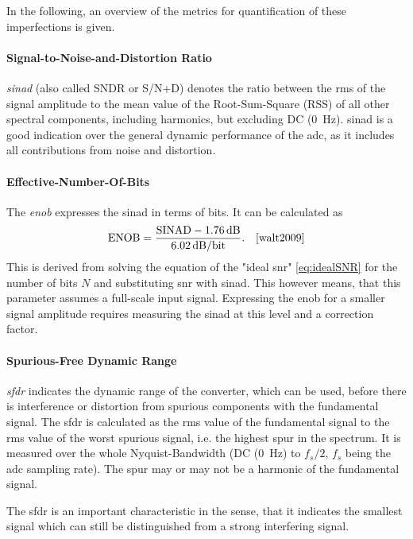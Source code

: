 In the following, an overview of the metrics for quantification of these imperfections is given. 
\paragraph{Signal-to-Noise-and-Distortion Ratio}
\textit{\gls{sinad}} (also called SNDR or S/N+D) denotes the ratio between the \gls{rms} of the signal amplitude to the mean value of the Root-Sum-Square (RSS) of all other spectral components, including harmonics, but excluding  DC (\SI{0}{\hertz}). \gls{sinad} is a good indication over the general dynamic performance of the \gls{adc}, as it includes all contributions from noise and distortion.
\paragraph{Effective-Number-Of-Bits}
The \textit{\gls{enob}} expresses the \gls{sinad} in terms of bits. It can be calculated as
\begin{equation}
	\text{ENOB} = \frac{\text{SINAD}-\SI{1.76}{\decibel}}{\SI{6.02}{\decibel}/\text{bit}}. \quad \cite{walt2009}
\end{equation}
This is derived from solving the equation of the "ideal \gls{snr}" \autoref{eq:idealSNR} for the number of bits $N$ and substituting \gls{snr} with \gls{sinad}. This however means, that this parameter assumes a full-scale input signal. Expressing the \gls{enob} for a smaller signal amplitude requires measuring the \gls{sinad} at this level and a correction factor. \cite{walt}
\paragraph{Spurious-Free Dynamic Range}
\textit{\gls{sfdr}} indicates the dynamic range of the converter, which can be used, before there is interference or distortion from spurious components with the fundamental signal. \cite{Lundberg} The \gls{sfdr} is calculated as the \gls{rms} value of the fundamental signal to the \gls{rms} value of the worst spurious signal, i.e. the highest spur in the spectrum. It is measured over the whole Nyquist-Bandwidth (DC (\SI{0}{\hertz}) to $f_s/2$, $f_s$ being the \gls{adc} sampling rate). The spur may or may not be a harmonic of the fundamental signal. \cite{walt2009} \cite{Lundberg}

The \gls{sfdr} is an important characteristic in the sense, that it indicates the smallest signal which can still be distinguished from a strong interfering signal. \cite{walt2009} 

